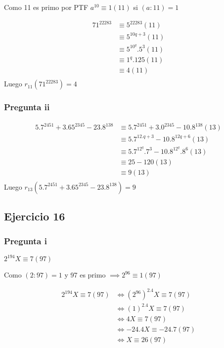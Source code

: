 Como 11 es primo por PTF $ a^{10} \equiv 1(11) $ si $ (a:11) = 1 $

\begin{align*}
    71^{22283} &\equiv 5^{22283} (11) \\
    &\equiv 5^{10q+3} (11) \\
    &\equiv 5^{10^q}. 5^3 (11) \\
    &\equiv 1^q. 125 (11) \\
    &\equiv 4 (11) \\
\end{align*}
Luego $ r_{11}(71^{22283}) = 4 $

\subsubsection{Pregunta ii}
\begin{align*}
    5.7^{2451} + 3.65^{2345} - 23.8^{138} &\equiv 5.7^{2451} +3.0^{2345} - 10.8^{138}(13) \\
    &\equiv 5.7^{12.q+3} - 10.8^{12q+6}(13) \\
    &\equiv 5.7^{12^q}. 7^3 - 10.8^{12^q}. 8^6(13) \\
    &\equiv 25 - 120(13) \\
    &\equiv 9(13) \\
\end{align*}
Luego $ r_{13}(5.7^{2451} + 3.65^{2345} - 23.8^{138}) = 9 $

\subsection{Ejercicio 16}

\subsubsection{Pregunta i}

$ 2^{194} X \equiv 7(97) $

Como $ (2:97) = 1 $ y 97 es primo $ \implies 2^{96} \equiv 1(97) $

\begin{align*}
    2^{194} X \equiv 7(97) &\iff (2^{96})^2.4X \equiv 7(97) \\
    &\iff (1)^2.4X \equiv 7(97) \\
    &\iff 4X \equiv 7(97) \\
    &\iff -24.4X \equiv -24.7(97) \\
    &\iff X \equiv 26(97) \\
\end{align*}

